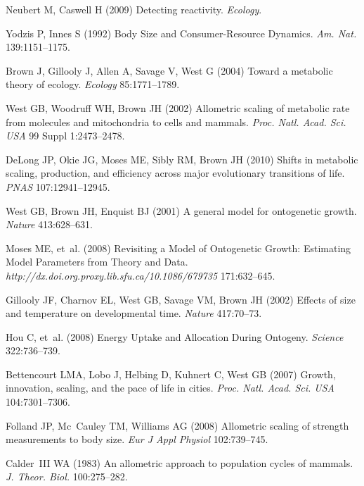 \documentclass{pnastwo}
\begin{document}
\begin{article}
\begin{thebibliography}{10}
Neubert M, Caswell H
\newblock (2009) {Detecting reactivity}.
\newblock \emph{Ecology}.

Yodzis P, Innes S
\newblock (1992) {Body Size and Consumer-Resource Dynamics}.
\newblock \emph{Am. Nat.} 139:1151--1175.

Brown J, Gillooly J, Allen A, Savage V, West G
\newblock (2004) {Toward a metabolic theory of ecology}.
\newblock \emph{Ecology} 85:1771--1789.

West GB, Woodruff WH, Brown JH
\newblock (2002) {Allometric scaling of metabolic rate from molecules and
  mitochondria to cells and mammals.}
\newblock \emph{Proc. Natl. Acad. Sci. USA} 99 Suppl 1:2473--2478.

DeLong JP, Okie JG, Moses ME, Sibly RM, Brown JH
\newblock (2010) {Shifts in metabolic scaling, production, and efficiency
  across major evolutionary transitions of life.}
\newblock \emph{PNAS} 107:12941--12945.

West GB, Brown JH, Enquist BJ
\newblock (2001) {A general model for ontogenetic growth}.
\newblock \emph{Nature} 413:628--631.

Moses ME, {et~al.}
\newblock (2008) {Revisiting a Model of Ontogenetic Growth: Estimating Model
  Parameters from Theory and Data}.
\newblock \emph{http://dx.doi.org.proxy.lib.sfu.ca/10.1086/679735}
  171:632--645.

Gillooly JF, Charnov EL, West GB, Savage VM, Brown JH
\newblock (2002) {Effects of size and temperature on developmental time}.
\newblock \emph{Nature} 417:70--73.

Hou C, {et~al.}
\newblock (2008) {Energy Uptake and Allocation During Ontogeny}.
\newblock \emph{Science} 322:736--739.

Bettencourt LMA, Lobo J, Helbing D, Kuhnert C, West GB
\newblock (2007) {Growth, innovation, scaling, and the pace of life in cities}.
\newblock \emph{Proc. Natl. Acad. Sci. USA} 104:7301--7306.

Folland JP, Mc~Cauley TM, Williams AG
\newblock (2008) {Allometric scaling of strength measurements to body size}.
\newblock \emph{Eur J Appl Physiol} 102:739--745.

Calder~III WA
\newblock (1983) {An allometric approach to population cycles of mammals}.
\newblock \emph{J. Theor. Biol.} 100:275--282.


\end{thebibliography}
\end{article}
\end{document}
